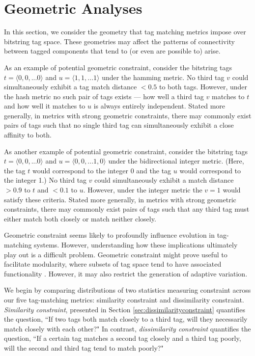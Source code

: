 \section{Geometric Analyses} \label{sec:geometric}

In this section, we consider the geometry that tag matching metrics impose over bitstring tag space.
These geometries may affect the patterns of connectivity between tagged components that tend to (or even are possible to) arise.

As an example of potential geometric constraint, consider the bitstring tags $t = \langle 0, 0, ... 0 \rangle$ and $u = \langle 1, 1, ... 1 \rangle$ under the hamming metric.
No third tag $v$ could simultaneously exhibit a tag match distance $< 0.5$ to both tags.
However, under the hash metric no such pair of tags exists --- how well a third tag $v$ matches to $t$ and how well it matches to $u$ is always entirely independent.
Stated more generally, in metrics with strong geometric constraints, there may commonly exist pairs of tags such that no single third tag can simultaneously exhibit a close affinity to both.

As another example of potential geometric constraint, consider the bitstring tags $t = \langle 0, 0, ... 0 \rangle$ and $u = \langle 0, 0, ... 1 , 0 \rangle$ under the bidirectional integer metric.
(Here, the tag $t$ would correspond to the integer 0 and the tag $u$ would correspond to the integer 1.)
No third tag $v$ could simultaneously exhibit a match distance $> 0.9$ to $t$ and $< 0.1$ to $u$.
However, under the integer metric the $v = 1$ would satisfy these criteria.
Stated more generally, in metrics with strong geometric constraints, there may commonly exist pairs of tags such that any third tag must either match both closely or match neither closely.

Geometric constraint seems likely to profoundly influence evolution in tag-matching systems.
However, understanding how these implications ultimately play out is a difficult problem.
Geometric constraint might prove useful to facilitate modularity, where subsets of tag space tend to have associated functionality \citep{holland1990concerning}.
However, it may also restrict the generation of adaptive variation.

We begin by comparing distributions of two statistics measuring constraint across our five tag-matching metrics: similarity constraint and dissimilarity constraint.
\textit{Similarity constraint}, presented in Section \ref{sec:dissimilarityconstraint} quantifies the question, ``If two tags both match closely to a third tag, will they necessarily match closely with each other?"
In contrast, \textit{dissimilarity constraint} quantifies the question, ``If a certain tag matches a second tag closely and a third tag poorly, will the second and third tag tend to match poorly?"


